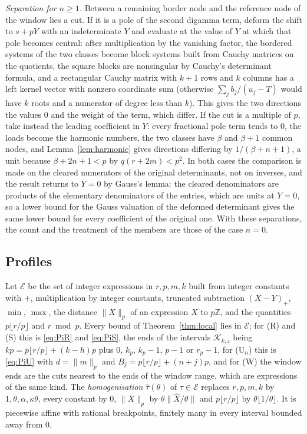 \documentclass[11pt]{amsart}
\theoremstyle{definition}
\theoremstyle{remark}
\numberwithin{equation}{section}
\newcommand{\Z}{\mathbb Z}
\begin{document}
\emph{Separation for $n\ge1$.} Between a remaining border node and the reference node of the window lies a cut. If it is a
pole of the second digamma term, deform the shift to $s+pY$ with an indeterminate $Y$ and evaluate at the value of $Y$ at
which that pole becomes central: after multiplication by the vanishing factor, the bordered systems of the two classes become
block systems built from Cauchy matrices on the quotients, the square blocks are nonsingular by Cauchy's determinant
formula, and a rectangular Cauchy matrix with $k+1$ rows and $k$ columns has a left kernel vector with nonzero coordinate sum
(otherwise $\sum_jb_j/(u_j-T)$ would have $k$ roots and a numerator of degree less than $k$). This gives the two directions
the values $0$ and the weight of the term, which differ. If the cut is a multiple of $p$, take instead the leading
coefficient in $Y$: every fractional pole term tends to $0$, the loads become the harmonic numbers, the two classes have
$\beta$ and $\beta+1$ common nodes, and Lemma~\ref{lem:harmonic} gives directions differing by $1/(\beta+n+1)$, a unit because
$\beta+2n+1<p$ by $q(r+2m)<p^2$. In both cases the comparison is made on the cleared numerators of the original determinants,
not on inverses, and the result returns to $Y=0$ by Gauss's lemma: the cleared denominators are products of the elementary
denominators of the entries, which are units at $Y=0$, so a lower bound for the Gauss valuation of the deformed determinant
gives the same lower bound for every coefficient of the original one. With these separations, the count and the treatment of
the members are those of the case $n=0$.

\subsection{Profiles}\label{ssec:profiles}
Let $\mathcal E$ be the set of integer expressions in $r,p,m,k$ built from integer constants with $+$, multiplication by
integer constants, truncated subtraction $(X-Y)_+$, $\min$, $\max$, the distance $\|X\|_p$ of an expression $X$ to $p\Z$,
and the quantities $p\lfloor r/p\rfloor$ and $r\bmod p$. Every bound of Theorem~\ref{thm:local} lies in $\mathcal E$; for (R)
and (S) this is \eqref{eq:PiR} and \eqref{eq:PiS}, the ends of the intervals $\mathcal K_{k,z}$ being $kp=p\lfloor r/p\rfloor+(k-h)p$
plus $0$, $k_p$, $k_p-1$, $p-1$ or $r_p-1$, for (U$_n$) this is \eqref{eq:PiU} with $d=\|m\|_p$ and $B_j=p\lfloor r/p\rfloor+(n+j)p$, and for (W) the window ends are the cuts nearest to the ends of the window
range, which are expressions of the same kind. The \emph{homogenisation} $\hat\tau(\theta)$ of $\tau\in\mathcal E$ replaces $r,p,m,k$ by
$1,\theta,\alpha,\kappa\theta$, every constant by $0$, $\|X\|_p$ by $\theta\|\hat X/\theta\|$ and $p\lfloor r/p\rfloor$ by
$\theta\lfloor1/\theta\rfloor$. It is piecewise affine with rational breakpoints, finitely many in every interval bounded
away from $0$.
\end{document}
